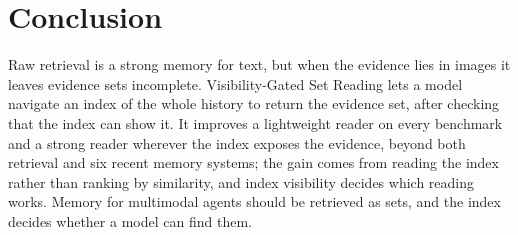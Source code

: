\section{Conclusion}
\label{sec:conclusion}

Raw retrieval is a strong memory for text, but when the evidence lies in images it leaves evidence sets incomplete. Visibility-Gated Set Reading lets a model navigate an index of the whole history to return the evidence set, after checking that the index can show it. It improves a lightweight reader on every benchmark and a strong reader wherever the index exposes the evidence, beyond both retrieval and six recent memory systems; the gain comes from reading the index rather than ranking by similarity, and index visibility decides which reading works. Memory for multimodal agents should be retrieved as sets, and the index decides whether a model can find them.
